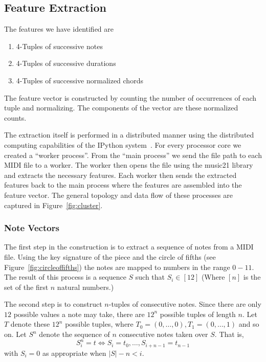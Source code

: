 \documentclass[twocolumn,dvipsnames]{article}
\newcommand\len[1]{\left|#1\right|}
\begin{document}
\subsection{Feature Extraction}

The features we have identified are
\begin{enumerate}
    \item 4-Tuples of successive notes
    \item 4-Tuples of successive durations
    \item 4-Tuples of successive normalized chords
\end{enumerate}

The feature vector is constructed by counting the number of occurrences of each tuple and normalizing.
The components of the vector are these normalized counts.

The extraction itself is performed in a distributed manner using the distributed computing capabilities of the IPython system~\cite{PERGRA}.
For every processor core we created a ``worker process''.
From the ``main process'' we send the file path to each MIDI file to a worker.
The worker then opens the file using the music21 library and extracts the necessary features.
Each worker then sends the extracted features back to the main process where the features are assembled into the feature vector.
The general topology and data flow of these processes are captured in Figure~\ref{fig:cluster}. 

\subsubsection{Note Vectors}\label{sec:vectors}
The first step in the construction is to extract a sequence of notes from a MIDI file.
Using the key signature of the piece and the circle of fifths (see Figure~\ref{fig:circleoffifths}) the notes are
mapped to numbers in the range $0-11$.
The result of this process is a sequence $S$ such that $S_i \in [12]$ (Where $[n]$ is the set of the first $n$ natural numbers.)

The second step is to construct $n$-tuples of consecutive notes.
Since there are only $12$ possible values a note may take,
there are $12^n$ possible tuples of length $n$.
Let $T$ denote these $12^n$ possible tuples,
where $T_0 = (0, \dots, 0), T_1 = (0, \dots, 1)$ and so on.
Let $S^n$ denote the sequence of $n$ consecutive notes taken over $S$.
That is,
\begin{equation*}
    S^n_i = t \iff S_i = t_0, \dots, S_{i + n - 1} = t_{n-1}
\end{equation*}
with $S_i = 0$ as appropriate when $\len{S} - n < i$.
\end{document}
